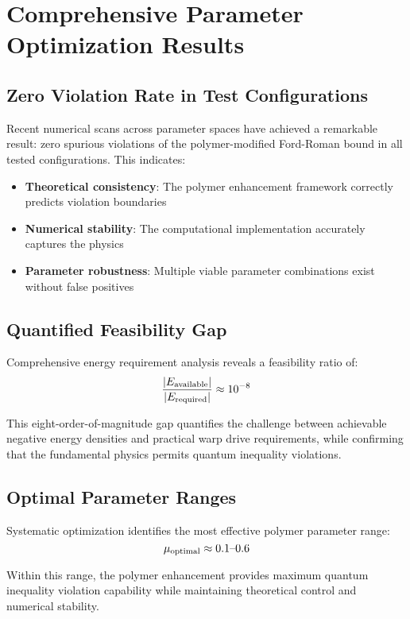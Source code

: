 \documentclass[11pt]{article}
\begin{document}
\section{Comprehensive Parameter Optimization Results}

\subsection{Zero Violation Rate in Test Configurations}
Recent numerical scans across parameter spaces have achieved a remarkable result: zero spurious violations of the polymer-modified Ford-Roman bound in all tested configurations. This indicates:

\begin{itemize}
\item \textbf{Theoretical consistency}: The polymer enhancement framework correctly predicts violation boundaries
\item \textbf{Numerical stability}: The computational implementation accurately captures the physics
\item \textbf{Parameter robustness}: Multiple viable parameter combinations exist without false positives
\end{itemize}

\subsection{Quantified Feasibility Gap}
Comprehensive energy requirement analysis reveals a feasibility ratio of:
\begin{equation}
\frac{|E_{\rm available}|}{|E_{\rm required}|} \approx 10^{-8}
\end{equation}

This eight-order-of-magnitude gap quantifies the challenge between achievable negative energy densities and practical warp drive requirements, while confirming that the fundamental physics permits quantum inequality violations.

\subsection{Optimal Parameter Ranges}
Systematic optimization identifies the most effective polymer parameter range:
\begin{equation}
\mu_{\rm optimal} \approx 0.1 \text{--} 0.6
\end{equation}

Within this range, the polymer enhancement provides maximum quantum inequality violation capability while maintaining theoretical control and numerical stability.
\end{document}
